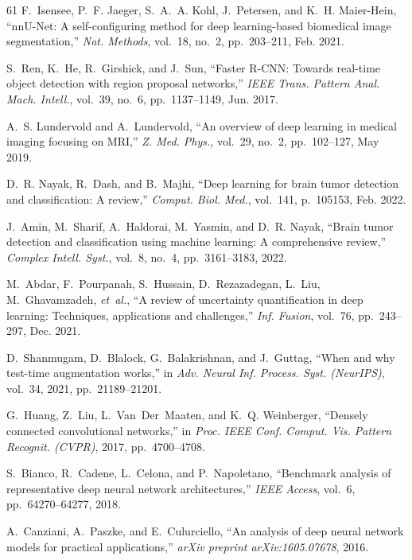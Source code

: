 \begin{thebibliography}{61}
F.~Isensee, P.~F. Jaeger, S.~A.~A. Kohl, J.~Petersen, and K.~H. Maier-Hein, ``nnU-Net: A self-configuring method for deep learning-based biomedical image segmentation,'' \emph{Nat. Methods}, vol.~18, no.~2, pp.~203--211, Feb. 2021. 

S.~Ren, K.~He, R.~Girshick, and J.~Sun, ``Faster R-CNN: Towards real-time object detection with region proposal networks,'' \emph{IEEE Trans. Pattern Anal. Mach. Intell.}, vol.~39, no.~6, pp.~1137--1149, Jun. 2017. 

A.~S. Lundervold and A.~Lundervold, ``An overview of deep learning in medical imaging focusing on MRI,'' \emph{Z. Med. Phys.}, vol.~29, no.~2, pp.~102--127, May 2019. 

D.~R. Nayak, R.~Dash, and B.~Majhi, ``Deep learning for brain tumor detection and classification: A review,'' \emph{Comput. Biol. Med.}, vol.~141, p.~105153, Feb. 2022. 

J.~Amin, M.~Sharif, A.~Haldorai, M.~Yasmin, and D.~R. Nayak, ``Brain tumor detection and classification using machine learning: A comprehensive review,'' \emph{Complex Intell. Syst.}, vol.~8, no.~4, pp.~3161--3183, 2022. 

M.~Abdar, F.~Pourpanah, S.~Hussain, D.~Rezazadegan, L.~Liu, M.~Ghavamzadeh, \emph{et~al.}, ``A review of uncertainty quantification in deep learning: Techniques, applications and challenges,'' \emph{Inf. Fusion}, vol.~76, pp.~243--297, Dec. 2021. 

D.~Shanmugam, D.~Blalock, G.~Balakrishnan, and J.~Guttag, ``When and why test-time augmentation works,'' in \emph{Adv. Neural Inf. Process. Syst. (NeurIPS)}, vol.~34, 2021, pp.~21189--21201.

G.~Huang, Z.~Liu, L.~Van~Der~Maaten, and K.~Q. Weinberger, ``Densely connected convolutional networks,'' in \emph{Proc. IEEE Conf. Comput. Vis. Pattern Recognit. (CVPR)}, 2017, pp.~4700--4708.

S.~Bianco, R.~Cadene, L.~Celona, and P.~Napoletano, ``Benchmark analysis of representative deep neural network architectures,'' \emph{IEEE Access}, vol.~6, pp.~64270--64277, 2018. 

A.~Canziani, A.~Paszke, and E.~Culurciello, ``An analysis of deep neural network models for practical applications,'' \emph{arXiv preprint arXiv:1605.07678}, 2016.

\end{thebibliography}
